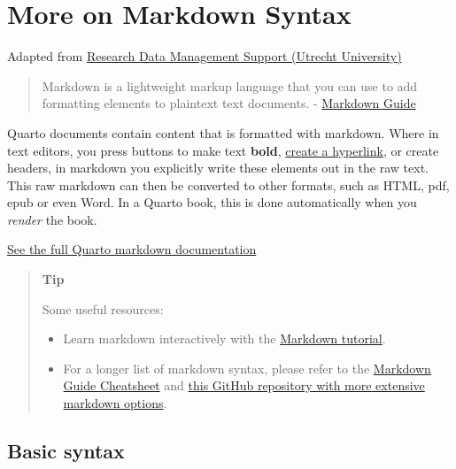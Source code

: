 \documentclass[
  letterpaper,
  DIV=11,
  numbers=noendperiod,
  oneside]{scrreprt}
\providecommand{\tightlist}{%
  \setlength{\itemsep}{0pt}\setlength{\parskip}{0pt}}
\begin{document}
\begin{tcolorbox}
\begin{figure}[H]
\end{figure}%

\chapter{More on Markdown Syntax}\label{more-on-markdown-syntax}

Adapted from
\href{https://utrechtuniversity.github.io/open-textbooks/}{Research Data
Management Support (Utrecht University)}

\begin{quote}
Markdown is a lightweight markup language that you can use to add
formatting elements to plaintext text documents. -
\href{https://www.markdownguide.org/getting-started/}{Markdown Guide}
\end{quote}

Quarto documents contain content that is formatted with markdown. Where
in text editors, you press buttons to make text \textbf{bold},
\href{https://www.markdownguide.org/basic-syntax/\#links}{create a
hyperlink}, or create headers, in markdown you explicitly write these
elements out in the raw text. This raw markdown can then be converted to
other formats, such as HTML, pdf, epub or even Word. In a Quarto book,
this is done automatically when you \emph{render} the book.

\href{https://quarto.org/docs/authoring/markdown-basics.html}{See the
full Quarto markdown documentation}

\begin{quote}
\textbf{Tip}

Some useful resources:

\begin{itemize}
\tightlist
\item
  Learn markdown interactively with the
  \href{https://www.markdowntutorial.com/}{Markdown tutorial}.
\item
  For a longer list of markdown syntax, please refer to the
  \href{https://www.markdownguide.org/cheat-sheet/}{Markdown Guide
  Cheatsheet} and
  \href{https://github.com/lifeparticle/Markdown-Cheatsheet}{this GitHub
  repository with more extensive markdown options}.
\end{itemize}
\end{quote}

\section{Basic syntax}\label{basic-syntax}


\end{tcolorbox}
\end{document}

